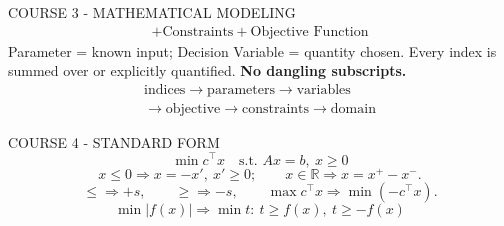 \documentclass[10pt,landscape]{article}
\newcommand{\R}{\mathbb{R}}
\begin{document}
{\begin{minipage}[t]{0.245\textwidth}
\begin{theorybox}{COURSE 3 - MATHEMATICAL MODELING}
\[{\begin{gathered}
+\text{Constraints}+\text{Objective Function}
\end{gathered}}
\]
Parameter = known input; Decision Variable = quantity chosen. Every index is summed over or explicitly quantified. \textbf{No dangling subscripts.}
\[
\boxed{\begin{gathered}
\text{indices}\to\text{parameters}\to\text{variables}\\[-1pt]
\to\text{objective}\to\text{constraints}\to\text{domain}
\end{gathered}}
\]
\end{theorybox}
\end{minipage}\hfill
\begin{minipage}[t]{0.245\textwidth}\vspace{0pt}
\begin{theorybox}{COURSE 4 - STANDARD FORM}
\[
\boxed{\min c^\top x\quad\text{s.t. }Ax=b,\ x\ge0}
\]
\[
x\le0\Rightarrow x=-x',\ x'\ge0;\qquad x\in\R\Rightarrow x=x^+-x^-.
\]
\[
\le\Rightarrow+s,\qquad \ge\Rightarrow-s,\qquad \max c^\top x\Rightarrow\min(-c^\top x).
\]
\[
\boxed{\min|f(x)|\Rightarrow\min t:\ t\ge f(x),\ t\ge-f(x)}
\]
\end{theorybox}
\end{minipage}}
\vspace{1.2pt}
\noindent
\end{document}
